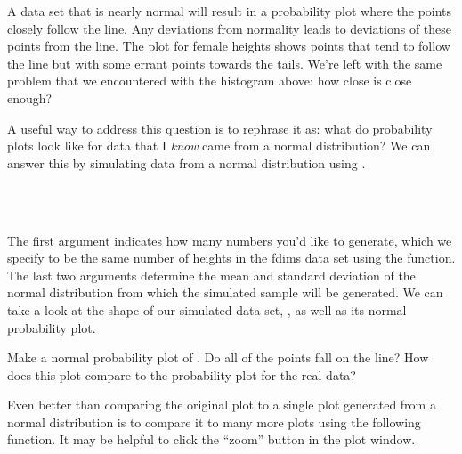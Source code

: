 \documentclass[11pt]{article}
\begin{document}
A data set that is nearly normal will result in a probability plot where the points closely follow the line.  Any deviations from normality leads to deviations of these points from the line.  The plot for female heights shows points that tend to follow the line but with some errant points towards the tails.  We're left with the same problem that we encountered with the histogram above: how close is close enough?

A useful way to address this question is to rephrase it as: what do probability plots look like for data that I \emph{know} came from a normal distribution?  We can answer this by simulating data from a normal distribution using \texttt{}.

\ttfamily\noindent
\hlstd{}\hspace*{\fill}\\
\hlstd{}\hlassignement{\usebox{\hlnormalsizeboxlessthan}-}{\ }\hlkeyword{(}\hlargument{=}{\ }\hlkeyword{(}\hlkeyword{)}\hlkeyword{,}{\ }\hlargument{=}{\ }\hlkeyword{,}{\ }\hlargument{=}{\ }\hlkeyword{)}
\hspace*{\fill}\\
\normalfont

The first argument indicates how many numbers you'd like to generate, which we specify to be the same number of heights in the fdims data set using the \texttt{} function.  The last two arguments determine the mean and standard deviation of the normal distribution from which the simulated sample will be generated.  We can take a look at the shape of our simulated data set, \texttt{}, as well as its normal probability plot.

\begin{exercise}
Make a normal probability plot of \texttt{}.  Do all of the points fall on the line?  How does this plot compare to the probability plot for the real data?
\end{exercise}

Even better than comparing the original plot to a single plot generated from a normal distribution is to compare it to many more plots using the following function. It may be helpful to click the ``zoom'' button in the plot window.

\ttfamily\noindent
\hlstd{}\hspace*{\fill}\\
\hlstd{}\hlkeyword{(}\hlkeyword{)}\hspace*{\fill}\\
\normalfont
\end{document}
